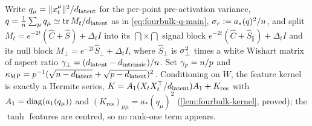 Write $q_\mu=\|x_t^\mu\|^2/d_{\mathrm{latent}}$ for the per-point pre-activation variance, $q=\tfrac1{n}\sum_\mu q_\mu\simeq\operatorname{tr}M_t/d_{\mathrm{latent}}$ as in \eqref{eq:fourbulk-q-main}, $\sigma_r:=a_*(q)^2/n$, and split $M_t=e^{-2t}(\hat C+\hat S)+\Delta_tI$ into its $\dint\times\dint$ signal block $e^{-2t}(\hat C+\hat S_\parallel)+\Delta_tI$ and its null block $M_\perp=e^{-2t}\hat S_\perp+\Delta_tI$, where $\hat S_\perp$ is $\sigma_{\perp}^2$ times a white Wishart matrix of aspect ratio $\gamma_\perp=(d_{\mathrm{latent}}-d_{\mathrm{intrinsic}})/n$. Set $\gamma_p=n/p$ and $\kappa_{\mathrm{MP}}=p^{-1}(\sqrt{n-d_{\mathrm{latent}}}+\sqrt{p-d_{\mathrm{latent}}})^2$. Conditioning on $W$, the feature kernel is exactly a Hermite series, $K=A_1(X_tX_t^{\top}/d_{\mathrm{latent}})A_1+K_{\mathrm{res}}$ with $A_1=\operatorname{diag}(a_1(q_\mu))$ and $(K_{\mathrm{res}})_{\mu\mu}=a_*(q_\mu)^2$ (\cref{lem:fourbulk-kernel}, proved); the $\tanh$ features are centred, so no rank-one term appears.

